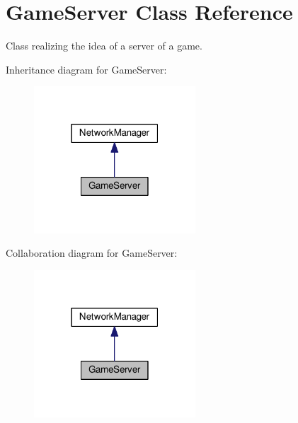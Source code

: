 \hypertarget{classGameServer}{}\section{Game\+Server Class Reference}
\label{classGameServer}


Class realizing the idea of a server of a game.  




Inheritance diagram for Game\+Server\+:
\nopagebreak
\begin{figure}[H]
\begin{center}
\leavevmode
\includegraphics[width=171pt]{classGameServer__inherit__graph}
\end{center}
\end{figure}


Collaboration diagram for Game\+Server\+:
\nopagebreak
\begin{figure}[H]
\begin{center}
\leavevmode
\includegraphics[width=171pt]{classGameServer__coll__graph}
\end{center}
\end{figure}
